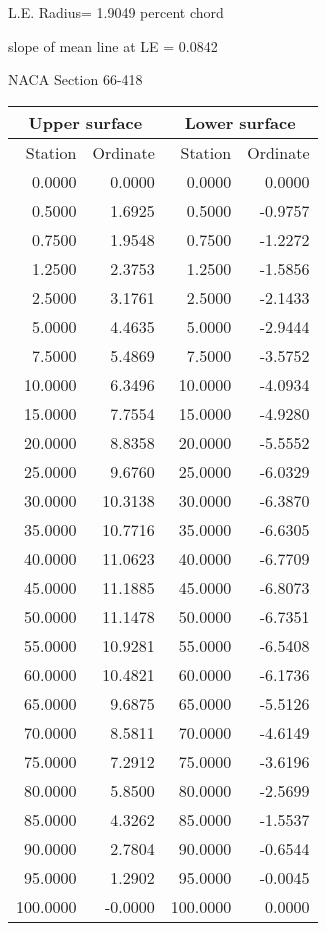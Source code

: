 \documentclass[11pt]{book}
\begin{document}
L.E. Radius=  1.9049 percent chord


 slope of mean line at LE =  0.0842
 \newpage
  \label{s66-418}
 \begin{Large}
 NACA Section 66-418
 \end{Large}
  
 \vspace{8mm}
 \begin{tabular}{|r|r|r|r|} \hline 
 \multicolumn{2}{|c|}{Upper surface} & \multicolumn{2}{|c|}{Lower surface} \\
 \hline
 Station & Ordinate & Station & Ordinate \\
 \hline
0.0000 & 0.0000 & 0.0000 & 0.0000 \\
0.5000 & 1.6925 & 0.5000 & -0.9757 \\
0.7500 & 1.9548 & 0.7500 & -1.2272 \\
1.2500 & 2.3753 & 1.2500 & -1.5856 \\
2.5000 & 3.1761 & 2.5000 & -2.1433 \\
5.0000 & 4.4635 & 5.0000 & -2.9444 \\
7.5000 & 5.4869 & 7.5000 & -3.5752 \\
10.0000 & 6.3496 & 10.0000 & -4.0934 \\
15.0000 & 7.7554 & 15.0000 & -4.9280 \\
20.0000 & 8.8358 & 20.0000 & -5.5552 \\
25.0000 & 9.6760 & 25.0000 & -6.0329 \\
30.0000 & 10.3138 & 30.0000 & -6.3870 \\
35.0000 & 10.7716 & 35.0000 & -6.6305 \\
40.0000 & 11.0623 & 40.0000 & -6.7709 \\
45.0000 & 11.1885 & 45.0000 & -6.8073 \\
50.0000 & 11.1478 & 50.0000 & -6.7351 \\
55.0000 & 10.9281 & 55.0000 & -6.5408 \\
60.0000 & 10.4821 & 60.0000 & -6.1736 \\
65.0000 & 9.6875 & 65.0000 & -5.5126 \\
70.0000 & 8.5811 & 70.0000 & -4.6149 \\
75.0000 & 7.2912 & 75.0000 & -3.6196 \\
80.0000 & 5.8500 & 80.0000 & -2.5699 \\
85.0000 & 4.3262 & 85.0000 & -1.5537 \\
90.0000 & 2.7804 & 90.0000 & -0.6544 \\
95.0000 & 1.2902 & 95.0000 & -0.0045 \\
100.0000 & -0.0000 & 100.0000 & 0.0000 \\
 \hline 
 \end{tabular}
\end{document}

